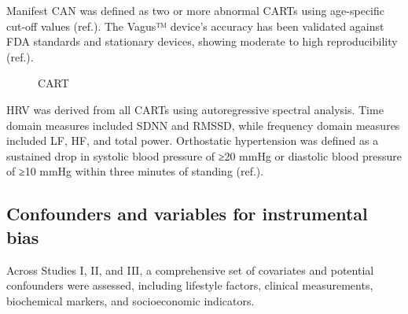 \documentclass[
  a4paper,
  headsepline=true,
  open=any]{scrbook}
\begin{document}
Manifest CAN was defined as two or more abnormal CARTs using
age-specific cut-off values (ref.). The Vagus™ device's accuracy has
been validated against FDA standards and stationary devices, showing
moderate to high reproducibility (ref.).

\begin{figure}

\begin{minipage}[t]{\linewidth}

{\centering 


\caption{CART}

}

\end{minipage}%

\end{figure}

HRV was derived from all CARTs using autoregressive spectral analysis.
Time domain measures included SDNN and RMSSD, while frequency domain
measures included LF, HF, and total power. Orthostatic hypertension was
defined as a sustained drop in systolic blood pressure of ≥20 mmHg or
diastolic blood pressure of ≥10 mmHg within three minutes of standing
(ref.).

\hypertarget{confounders-and-variables-for-instrumental-bias}{%
\subsection{Confounders and variables for instrumental
bias}\label{confounders-and-variables-for-instrumental-bias}}

Across Studies I, II, and III, a comprehensive set of covariates and
potential confounders were assessed, including lifestyle factors,
clinical measurements, biochemical markers, and socioeconomic
indicators.
\end{document}
